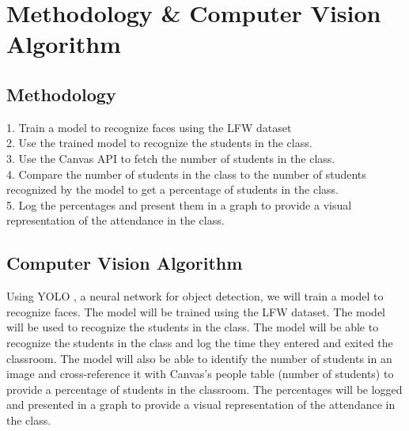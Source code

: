 \section{Methodology \& Computer Vision Algorithm}
\label{sec:method}
\subsection{Methodology}
\label{subsec:method}
1. Train a model to recognize faces using the LFW dataset\\
2. Use the trained model to recognize the students in the class.\\
3. Use the Canvas API to fetch the number of students in the class.\\
4. Compare the number of students in the class to the number of students recognized by the model to get a percentage of students in the class.\\
5. Log the percentages and present them in a graph to provide a visual representation of the attendance in the class.\\

\subsection{Computer Vision Algorithm}
\label{subsec:Computer Vision Algorithm}
Using YOLO \cite{YOLO}, a neural network for object detection, we will train a model to recognize faces. The model will be trained using the LFW dataset. The model will be used to recognize the students in the class. The model will be able to recognize the students in the class and log the time they entered and exited the classroom. The model will also be able to identify the number of students in an image and cross-reference it with Canvas's people table (number of students) to provide a percentage of students in the classroom. The percentages will be logged and presented in a graph to provide a visual representation of the attendance in the class.\\
